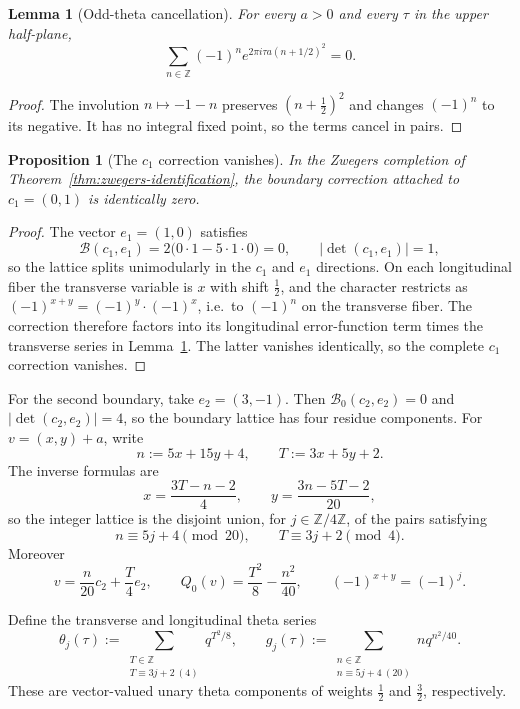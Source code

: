 \documentclass[12pt]{amsart}
\newtheorem{proposition}[theorem]{Proposition}
\newtheorem{lemma}[theorem]{Lemma}
\theoremstyle{definition}
\theoremstyle{remark}
\newcommand{\ZZ}{\mathbb{Z}}
\begin{document}
\begin{lemma}[Odd-theta cancellation]\label{lem:odd-theta}
For every $a>0$ and every $\tau$ in the upper half-plane,
\[
  \sum_{n\in\ZZ}(-1)^n
  e^{2\pi i\tau a(n+1/2)^2}=0.
\]
\end{lemma}

\begin{proof}
The involution $n\mapsto-1-n$ preserves $(n+\tfrac12)^2$ and changes
$(-1)^n$ to its negative.  It has no integral fixed point, so the terms
cancel in pairs.
\end{proof}

\begin{proposition}[The $c_1$ correction vanishes]
\label{prop:c1-vanishes}
In the Zwegers completion of Theorem~\ref{thm:zwegers-identification},
the boundary correction attached to $c_1=(0,1)$ is identically zero.
\end{proposition}

\begin{proof}
The vector $e_1=(1,0)$ satisfies
\[
  \mathcal B(c_1,e_1)=2\bigl(0\cdot 1-5\cdot 1\cdot 0\bigr)=0,
  \qquad |\det(c_1,e_1)|=1,
\]
so the lattice splits unimodularly in the $c_1$ and $e_1$ directions.
On each longitudinal fiber the transverse variable is $x$ with shift
$\tfrac12$, and the character restricts as
$(-1)^{x+y}=(-1)^{y}\cdot(-1)^{x}$, i.e.\ to $(-1)^n$ on the
transverse fiber.  The correction therefore
factors into its longitudinal error-function term times the transverse
series in Lemma~\ref{lem:odd-theta}.  The latter vanishes identically,
so the complete $c_1$ correction vanishes.
\end{proof}

For the second boundary, take $e_2=(3,-1)$.  Then
$\mathcal B_0(c_2,e_2)=0$ and $|\det(c_2,e_2)|=4$, so the boundary
lattice has four residue components.  For $v=(x,y)+a$, write
\[
  n:=5x+15y+4,
  \qquad
  T:=3x+5y+2.
\]
The inverse formulas are
\[
  x=\frac{3T-n-2}{4},
  \qquad
  y=\frac{3n-5T-2}{20},
\]
so the integer lattice is the disjoint union, for $j\in\ZZ/4\ZZ$, of
the pairs satisfying
\[
  n\equiv5j+4\pmod{20},
  \qquad
  T\equiv3j+2\pmod4.
\]
Moreover
\begin{equation}\label{eq:orthogonal-Q}
  v=\frac{n}{20}c_2+\frac{T}{4}e_2,
  \qquad
  Q_0(v)=\frac{T^2}{8}-\frac{n^2}{40},
  \qquad
  (-1)^{x+y}=(-1)^j.
\end{equation}

Define the transverse and longitudinal theta series
\begin{equation}\label{eq:theta-g-defs}
  \theta_j(\tau):=
  \sum_{\substack{T\in\ZZ\\T\equiv3j+2\ (4)}}q^{T^2/8},
  \qquad
  g_j(\tau):=
  \sum_{\substack{n\in\ZZ\\n\equiv5j+4\ (20)}}nq^{n^2/40}.
\end{equation}
These are vector-valued unary theta components of weights
$\tfrac12$ and $\tfrac32$, respectively.
\end{document}
